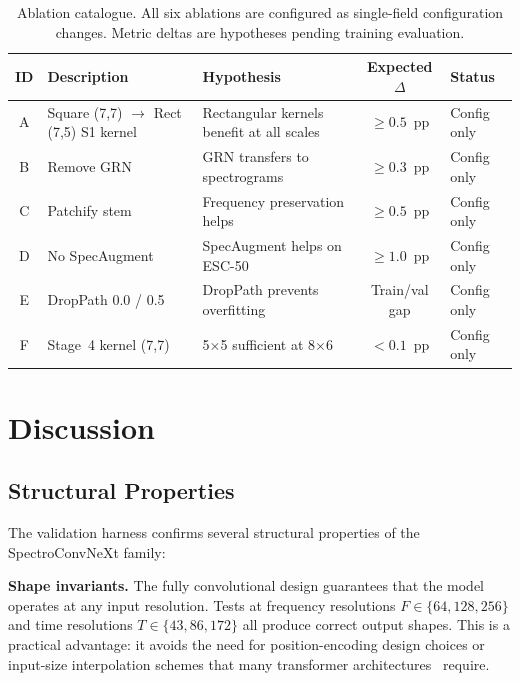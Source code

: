 \documentclass{article}
\begin{document}
\begin{table}[h]
  \centering
  \caption{Ablation catalogue. All six ablations are configured as single-field
  configuration changes. Metric deltas are hypotheses pending training
  evaluation.}
  \label{tab:ablations}
  \small
  \begin{tabular}{cp{3cm}p{2.5cm}c}
  \toprule
  \textbf{ID} & \textbf{Description} & \textbf{Hypothesis} & \textbf{Expected $\Delta$} & \textbf{Status} \\
  \midrule
  A & Square (7,7) $\to$ Rect (7,5) S1 kernel & Rectangular kernels benefit at all scales & $\geq 0.5$~pp & Config only \\
  B & Remove GRN & GRN transfers to spectrograms & $\geq 0.3$~pp & Config only \\
  C & Patchify stem & Frequency preservation helps & $\geq 0.5$~pp & Config only \\
  D & No SpecAugment & SpecAugment helps on ESC-50 & $\geq 1.0$~pp & Config only \\
  E & DropPath 0.0 / 0.5 & DropPath prevents overfitting & Train/val gap & Config only \\
  F & Stage~4 kernel (7,7) & 5$\times$5 sufficient at 8$\times$6 & $< 0.1$~pp & Config only \\
  \bottomrule
  \end{tabular}
\end{table}

\section{Discussion}

\subsection{Structural Properties}

The validation harness confirms several structural properties of the
SpectroConvNeXt family:

\textbf{Shape invariants.} The fully convolutional design guarantees that the
model operates at any input resolution. Tests at frequency resolutions
$F \in \{64, 128, 256\}$ and time resolutions $T \in \{43, 86, 172\}$ all
produce correct output shapes. This is a practical advantage: it avoids the
need for position-encoding design choices or input-size interpolation schemes
that many transformer architectures~\cite{vaswani2017attention,dosovitskiy2021vit} require.
\end{document}
